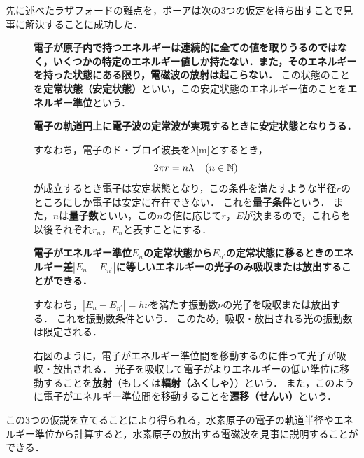 先に述べたラザフォードの難点を，ボーアは次の3つの仮定を持ち出すことで見事に解決することに成功した．
\begin{description}
\item[] {\bf 電子が原子内で持つエネルギーは連続的に全ての値を取りうるのではなく，いくつかの特定のエネルギー値しか持たない．また，そのエネルギーを持った状態にある限り，電磁波の放射は起こらない．}
この状態のことを{\bf 定常状態（安定状態）}といい，この安定状態のエネルギー値のことを{\bf エネルギー準位}という．
\item[] {\bf 電子の軌道円上に電子波の定常波が実現するときに安定状態となりうる．}

すなわち，電子のド・ブロイ波長を$\lambda$[m]とするとき，
\[2\pi r=n\lambda \hspace{4mm}(n\in \mathbb{N})\]
が成立するとき電子は安定状態となり，この条件を満たすような半径$r$のところにしか電子は安定に存在できない．
これを{\bf 量子条件}という．
また，$n$は{\bf 量子数}といい，この$n$の値に応じて$r$，$E$が決まるので，これらを以後それぞれ$r_n$，$E_n$と表すことにする．
\item[] {\bf 電子がエネルギー準位}\mbox{\boldmath$E_n$}{\bf の定常状態から}\mbox{\boldmath$E_{n^\prime}$}{\bf の定常状態に移るときのエネルギー差}\mbox{\boldmath$|E_n-E_{n^\prime}|$}{\bf に等しいエネルギーの光子のみ吸収または放出することができる．}

すなわち，$|E_n-E_{n^\prime}|=h\nu$を満たす振動数$\nu$の光子を吸収または放出する．
これを振動数条件という．
このため，吸収・放出される光の振動数は限定される．



右図のように，電子がエネルギー準位間を移動するのに伴って光子が吸収・放出される．
光子を吸収して電子がよりエネルギーの低い準位に移動することを{\bf 放射}（もしくは{\bf 輻射（ふくしゃ）}）という．
また，このように電子がエネルギー準位間を移動することを{\bf 遷移（せんい）}という．
\end{description}

この3つの仮説を立てることにより得られる，水素原子の電子の軌道半径やエネルギー準位から計算すると，水素原子の放出する電磁波を見事に説明することができる．

